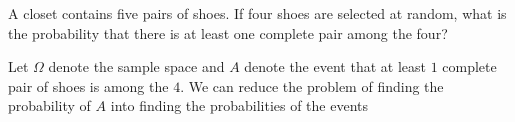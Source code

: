 \begin{problem}
  A closet contains five pairs of shoes. If four shoes are selected at
  random, what is the probability that there is at least one complete pair
  among the four?
\end{problem}
\begin{solution}
  Let \(\Omega\) denote the sample space and \(A\) denote the event that at
  least \(1\) complete pair of shoes is among the \(4\). We can reduce the
  problem of finding the probability of \(A\) into finding the
  probabilities of the events


\end{solution}
\newpage

